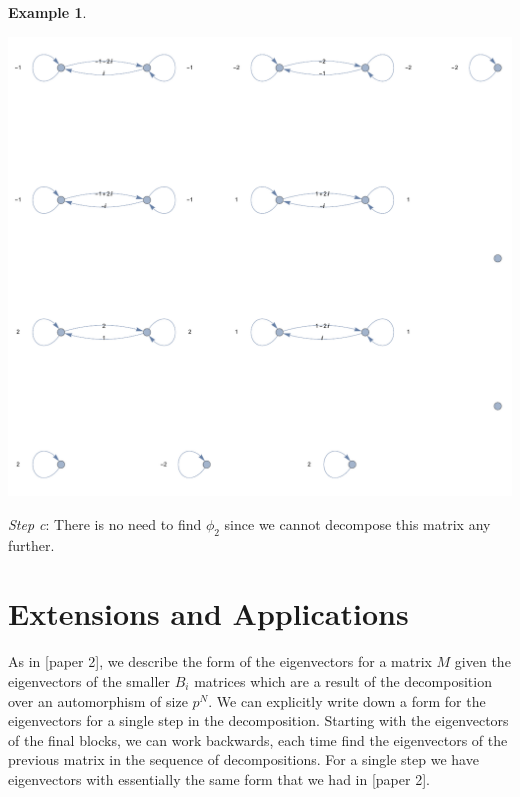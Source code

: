 \documentclass[preprint,12pt]{elsarticle}
\theoremstyle{definition}
\newtheorem{example}[thm]{Example}
\theoremstyle{remark}
\renewcommand{\emph}{\textit}
\begin{document}
\begin{example}
\begin{center}
\includegraphics[scale=.5]{ex2_3.pdf}
\end{center}

\emph{Step c}: There is no need to find $\phi_2$ since we cannot decompose this matrix any further.

\end{example}
\section{Extensions and Applications}
As in [paper 2], we describe the form of the eigenvectors for a matrix $M$ given the eigenvectors of the smaller $B_i$ matrices which are a result of the decomposition over an automorphism of size $p^N$.  We can explicitly write down a form for the eigenvectors for a single step in the decomposition.  Starting with the eigenvectors of the final blocks, we can work backwards, each time find the eigenvectors of the previous matrix in the sequence of decompositions.
For a single step we have eigenvectors with essentially the same form that we had in [paper 2].
\end{document}
